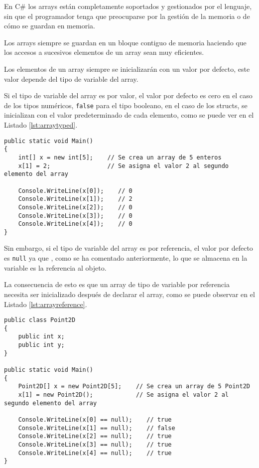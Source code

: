 \documentclass{pre-tfg}
\begin{document}
En C\# los arrays están completamente soportados y gestionados por el lenguaje, sin que el programador tenga que preocuparse por la gestión de la memoria o de cómo se guardan en memoria.

Los arrays siempre se guardan en un bloque contiguo de memoria haciendo que los accesos a sucesivos elementos de un array sean muy eficientes.

Los elementos de un array siempre se inicializarán con un valor por defecto, este valor depende del tipo de variable del array.

Si el tipo de variable del array es por valor, el valor por defecto es cero en el caso de los tipos numéricos, \texttt{false} para el tipo booleano, en el caso de los structs, se inicializan con el valor predeterminado de cada elemento, como se puede ver en el Listado \ref{lst:arraytyped}.

\begin{spacing}{1}
\begin{lstlisting}[float=htbp, caption=Ejemplo de array con tipo de variable por valor, label=lst:arraytyped]
public static void Main()
{
	int[] x = new int[5];    // Se crea un array de 5 enteros
	x[1] = 2;				 // Se asigna el valor 2 al segundo elemento del array
		
	Console.WriteLine(x[0]);    // 0
	Console.WriteLine(x[1]);    // 2
	Console.WriteLine(x[2]);    // 0
	Console.WriteLine(x[3]);    // 0
	Console.WriteLine(x[4]);    // 0
}
\end{lstlisting}
\end{spacing}

Sin embargo, si el tipo de variable del array es por referencia, el valor por defecto es \texttt{null} ya que , como se ha comentado anteriormente, lo que se almacena en la variable es la referencia al objeto.

La consecuencia de esto es que un array de tipo de variable por referencia necesita ser inicializado después de declarar el array, como se puede observar en el Listado \ref{lst:arrayreference}.

\begin{spacing}{1}
\begin{lstlisting}[float=htbp, caption=Ejemplo de array con tipo de variable por referencia, label=lst:arrayreference]
public class Point2D 
{ 
	public int x;
	public int y;
}

public static void Main()
{
	Point2D[] x = new Point2D[5];    // Se crea un array de 5 Point2D
	x[1] = new Point2D();			 // Se asigna el valor 2 al segundo elemento del array
		
	Console.WriteLine(x[0] == null);    // true
	Console.WriteLine(x[1] == null);    // false
	Console.WriteLine(x[2] == null);    // true
	Console.WriteLine(x[3] == null);    // true
	Console.WriteLine(x[4] == null);    // true
}
\end{lstlisting}
\end{spacing}
\end{document}

